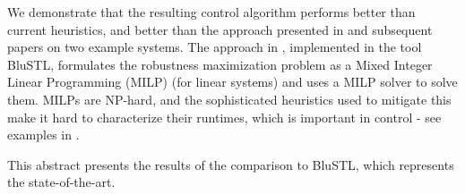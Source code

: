 We demonstrate that the resulting control algorithm performs better than current heuristics, and better than the approach presented in \cite{Raman14_MPCSTL} and subsequent papers on two example systems.
The approach in \cite{Raman14_MPCSTL}, implemented in the tool BluSTL, formulates the robustness maximization problem as a Mixed Integer Linear Programming (MILP) (for linear systems) and uses a MILP solver to solve them.
MILPs are NP-hard, and the sophisticated heuristics used to mitigate this make it hard to characterize their runtimes, which is important in control - see examples in \cite{Raman14_MPCSTL}.

This abstract presents the results of the comparison to BluSTL, which represents the state-of-the-art.

